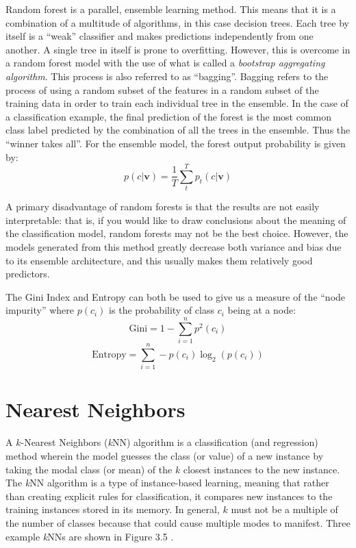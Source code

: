 \documentclass[a4paper, 12pt]{report}
\theoremstyle{definition}
\begin{document}
Random forest is a parallel, ensemble learning method. This means that it is a combination of a multitude of algorithms, in this case decision trees. Each tree by itself is a \enquote{weak} classifier and makes predictions independently from one another. A single tree in itself is prone to overfitting. However, this is overcome in a random forest model with the use of what is called a \textit{bootstrap aggregating algorithm}. This process is also referred to as \enquote{bagging}. Bagging refers to the process of using a random subset of the features in a random subset of the training data in order to train each individual tree in the ensemble. In the case of a classification example, the final prediction of the forest is the most common class label predicted by the combination of all the trees in the ensemble. Thus the \enquote{winner takes all}. For the ensemble model, the forest output probability is given by:
\begin{equation}
    p(c|\textbf{v}) = \frac{1}{T} \sum_t^T p_t (c | \textbf{v})
\end{equation}

A primary disadvantage of random forests is that the results are not easily interpretable: that is, if you would like to draw conclusions about the meaning of the classification model, random forests may not be the best choice. \autocite{vanderplas_2016} However, the models generated from this method greatly decrease both variance and bias due to its ensemble architecture, and this usually makes them relatively good predictors. 

The Gini Index and Entropy can both be used to give us a measure of the \enquote{node impurity} where $p(c_i)$ is the probability of class $c_i$ being at a node:
\begin{equation}
    \text{Gini} = 1 - \sum_{i=1}^n p^2(c_i) 
\end{equation}
\begin{equation}
    \text{Entropy} = \sum_{i=1}^n - p(c_i)\log_2\left(p(c_i)\right) 
\end{equation}

\section{Nearest Neighbors}

A $k$-Nearest Neighbors (\textit{k}NN) algorithm is a classification (and regression) method wherein the model guesses the class (or value) of a new instance by taking the modal class (or mean) of the $k$ closest instances to the new instance. The \textit{k}NN algorithm is a type of instance-based learning, meaning that rather than creating explicit rules for classification, it compares new instances to the training instances stored in its memory. In general, $k$ must not be a multiple of the number of classes because that could cause multiple modes to manifest. Three example \textit{k}NNs are shown in Figure 3.5 \autocite{introdatamining}.
\end{document}
